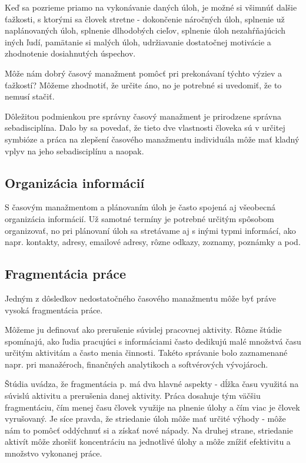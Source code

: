 \documentclass[10pt,slovak,a4paper]{article}
\begin{document}
		Keď sa pozrieme priamo na vykonávanie daných úloh, je možné si všimnúť dalšie ťažkosti, s ktorými sa človek stretne - dokončenie náročných úloh, splnenie už naplánovaných úloh, splnenie dlhodobých cieľov, splnenie úloh nezahŕňajúcich iných ľudí, pamätanie si malých úloh, udržiavanie dostatočnej motivácie a zhodnotenie dosiahnutých úspechov\cite{Franssila}.
		
		Môže nám dobrý časový manažment pomôcť pri prekonávaní týchto výziev a ťažkostí? Môžeme zhodnotiť, že určite áno, no je potrebné si uvedomiť, že to nemusí stačiť.
		
		Dôležitou podmienkou pre správny časový manažment je prirodzene správna sebadisciplína. Dalo by sa povedať, že tieto dve vlastnosti človeka sú v určitej symbióze a práca na zlepšení časového manažmentu individuála môže mať kladný vplyv na jeho sebadisciplínu a naopak.
		
	\subsection{Organizácia informácií}
	
		S časovým manažmentom a plánovaním úloh je často spojená aj všeobecná organizácia informácií. Už samotné termíny je potrebné určitým spôsobom organizovať, no pri plánovaní úloh sa stretávame aj s inými typmi informácí, ako napr. kontakty, adresy, emailové adresy, rôzne odkazy, zoznamy, poznámky a pod.
	
	\subsection{Fragmentácia práce}
		Jedným z dôsledkov nedostatočného časového manažmentu môže byť práve vysoká fragmentácia práce.
		
		Môžeme ju definovať ako prerušenie súvislej pracovnej aktivity. Rôzne štúdie spomínajú, ako ľudia pracujúci s informáciami často dedikujú malé množstvá času určitým aktivitám a často menia činnosti. Takéto správanie bolo zaznamenané napr. pri manažéroch, finančných analytikoch a softvérových vývojároch\cite{NoTask}.
		
		Štúdia\cite{NoTask} uvádza, že fragmentácia p. má dva hlavné aspekty - dĺžka času využitá na súvislú aktivitu a prerušenia danej aktivity. Práca dosahuje tým väčšiu fragmentáciu, čím menej času človek využije na plnenie úlohy a čím viac je človek vyrušovaný. Je síce pravda, že striedanie úloh môže mať určité výhody - môže nám to pomôcť oddýchnuť si a získať nové nápady. Na druhej strane, striedanie aktivít môže zhoršiť koncentráciu na jednotlivé úlohy a môže znížiť efektivitu a množstvo vykonanej práce\cite{NoTask}.
		
\end{document}
